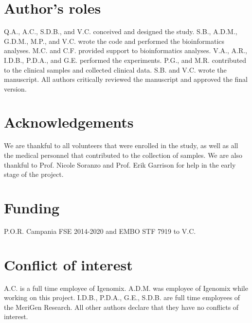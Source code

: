 \section*{Author’s roles}
Q.A., A.C., S.D.B., and V.C. conceived and designed the study. 
S.B., A.D.M., G.D.M., M.P., and V.C. wrote the code and performed the bioinformatics analyses.
M.C. and C.F. provided support to bioinformatics analyses. 
V.A., A.R., I.D.B., P.D.A., and G.E. performed the experiments.  
P.G., and M.R. contributed to the clinical samples and collected clinical data. 
S.B. and V.C. wrote the manuscript. 
All authors critically reviewed the manuscript and approved the final version.



\section*{Acknowledgements}
We are thankful to all volunteers that were enrolled in the study, as well as all the medical personnel that contributed to the collection of samples. We are also thankful to Prof. Nicole Soranzo and Prof. Erik Garrison for help in the early stage of the project.   


\section*{Funding}
P.O.R. Campania FSE 2014-2020 and EMBO STF 7919 to V.C. 

\section*{Conflict of interest}
A.C. is a full time employee of Igenomix. A.D.M. was employee of Igenomix while working on this project. I.D.B., P.D.A., G.E., S.D.B. are full time employees of the MeriGen Research. All other authors declare that they have no conflicts of interest.
